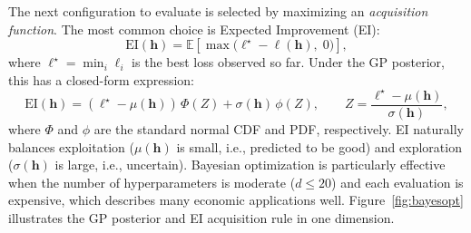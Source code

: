 \documentclass[11pt,a4paper]{report}
\newcommand{\E}[1]{\mathbb{E}\!\left[#1\right]}
\begin{document}
The next configuration to evaluate is selected by maximizing an \emph{acquisition function}.  The most common choice is Expected Improvement (EI):
\begin{equation}
\mathrm{EI}(\bm{h}) = \E{\max\bigl(\ell^\star - \ell(\bm{h}),\; 0\bigr)},
\end{equation}
where $\ell^\star = \min_i \ell_i$ is the best loss observed so far.  Under the GP posterior, this has a closed-form expression:
\begin{equation}
\mathrm{EI}(\bm{h}) = (\ell^\star - \mu(\bm{h}))\,\Phi(Z) + \sigma(\bm{h})\,\phi(Z),
\qquad Z = \frac{\ell^\star - \mu(\bm{h})}{\sigma(\bm{h})},
\end{equation}
where $\Phi$ and $\phi$ are the standard normal CDF and PDF, respectively.  EI naturally balances exploitation ($\mu(\bm{h})$ is small, i.e., predicted to be good) and exploration ($\sigma(\bm{h})$ is large, i.e., uncertain).  Bayesian optimization is particularly effective when the number of hyperparameters is moderate ($d \leq 20$) and each evaluation is expensive, which describes many economic applications well.  Figure~\ref{fig:bayesopt} illustrates the GP posterior and EI acquisition rule in one dimension.
\end{document}
